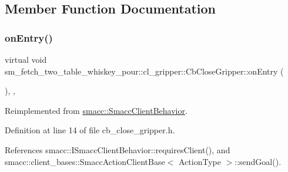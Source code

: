 \subsection{Member Function Documentation}
\mbox{\label{classsm__fetch__two__table__whiskey__pour_1_1cl__gripper_1_1CbCloseGripper_acbc50aeab65aa2fa0374feaf34d8009f}} 
\subsubsection{\texorpdfstring{on\+Entry()}{onEntry()}}
{\footnotesize\ttfamily virtual void sm\+\_\+fetch\+\_\+two\+\_\+table\+\_\+whiskey\+\_\+pour\+::cl\+\_\+gripper\+::\+Cb\+Close\+Gripper\+::on\+Entry (\begin{DoxyParamCaption}{ }\end{DoxyParamCaption})\hspace{0.3cm}{\ttfamily [inline]}, {\ttfamily [override]}, {\ttfamily [virtual]}}



Reimplemented from \hyperlink{classsmacc_1_1SmaccClientBehavior_ad5d3e1f1697c3cfe66c94cadba948493}{smacc\+::\+Smacc\+Client\+Behavior}.



Definition at line 14 of file cb\+\_\+close\+\_\+gripper.\+h.



References smacc\+::\+I\+Smacc\+Client\+Behavior\+::requires\+Client(), and smacc\+::client\+\_\+bases\+::\+Smacc\+Action\+Client\+Base$<$ Action\+Type $>$\+::send\+Goal().


